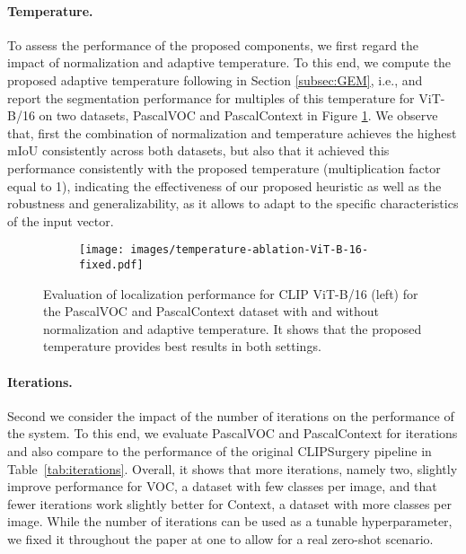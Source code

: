 \documentclass[10pt,twocolumn,letterpaper]{article}
\begin{document}
\paragraph{Temperature.} \label{subsec:temp}
To assess the performance of the proposed components, we first regard the impact of normalization and adaptive temperature. To this end, we compute the proposed adaptive temperature following in Section \ref{subsec:GEM}, i.e.,  and report the segmentation performance for multiples of this temperature for ViT-B/16 on two datasets, PascalVOC and PascalContext in Figure \ref{fig:temp-ablation}. 
We observe that, first the combination of normalization and temperature achieves the highest mIoU consistently across both datasets, but also that it achieved this performance consistently with the proposed temperature (multiplication factor equal to 1), indicating the effectiveness of our proposed heuristic as well as the robustness and generalizability, as it allows to adapt to the specific characteristics of the input vector. 
\begin{figure}[t] 
     \centering
     \begin{subfigure}[b]{0.45\textwidth}
         \centering
         \texttt{[image: images/temperature-ablation-ViT-B-16-fixed.pdf]}
    \end{subfigure}
    \vspace{-3mm}
    \caption{Evaluation of localization performance for CLIP ViT-B/16 (left) for the PascalVOC and PascalContext dataset with and without normalization and adaptive temperature. It shows that the proposed temperature provides best results in both settings.}\label{fig:temp-ablation}
\end{figure}
\vspace{-5mm}
\paragraph{Iterations.} Second we consider the impact of the number of iterations on the performance of the system. To this end, we evaluate PascalVOC and PascalContext for  iterations and also compare to the performance of the original CLIPSurgery pipeline in Table~\ref{tab:iterations}.  Overall, it shows that more iterations, namely two, slightly improve performance for VOC, a dataset with few classes per image, and that fewer iterations work slightly better for Context, a dataset with more classes per image. While the number of iterations can be used as a tunable hyperparameter, we fixed it throughout the paper at one to allow for a real zero-shot scenario. 
\end{document}
